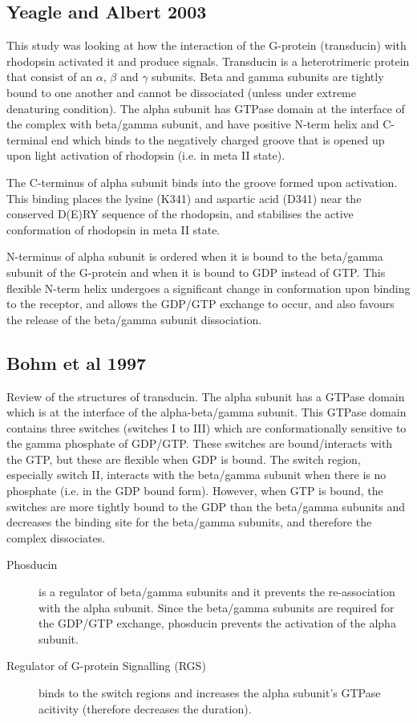 \documentclass[a4paper,12pt]{article}
\begin{document}
\subsection*{\normalsize{Yeagle and Albert 2003}}

This study was looking at how the interaction of the G-protein (transducin) with rhodopsin activated it and produce signals.
Transducin is a heterotrimeric protein that consist of an $\alpha$, $\beta$ and $\gamma$ subunits.
Beta and gamma subunits are tightly bound to one another and cannot be dissociated (unless under extreme denaturing condition).
The alpha subunit has GTPase domain at the interface of the complex with beta/gamma subunit, and have positive N-term helix and C-terminal end which binds to the negatively charged groove that is opened up upon light activation of rhodopsin (i.e. in meta II state).

The C-terminus of alpha subunit binds into the groove formed upon activation.
This binding places the lysine (K341) and aspartic acid (D341) near the conserved D(E)RY sequence of the rhodopsin, and stabilises the active conformation of rhodopsin in meta II state.

N-terminus of alpha subunit is ordered when it is bound to the beta/gamma subunit of the G-protein and when it is bound to GDP instead of GTP.
This flexible N-term helix undergoes a significant change in conformation upon binding to the receptor, and allows the GDP/GTP exchange to occur, and also favours the release of the beta/gamma subunit dissociation.

\subsection*{Bohm et al 1997}

Review of the structures of transducin.
The alpha subunit has a GTPase domain which is at the interface of the alpha-beta/gamma subunit.
This GTPase domain contains three switches (switches I to III) which are conformationally sensitive to the gamma phosphate of GDP/GTP.
These switches are bound/interacts with the GTP, but these are flexible when GDP is bound.
The switch region, especially switch II, interacts with the beta/gamma subunit when there is no phosphate (i.e. in the GDP bound form).
However, when GTP is bound, the switches are more tightly bound to the GDP than the beta/gamma subunits and decreases the binding site for the beta/gamma subunits, and therefore the complex dissociates.

\begin{description}
\item[Phosducin] is a regulator of beta/gamma subunits and it prevents the re-association with the alpha subunit.
Since the beta/gamma subunits are required for the GDP/GTP exchange, phosducin prevents the activation of the alpha subunit.
\item[Regulator of G-protein Signalling (RGS)] binds to the switch regions and increases the alpha subunit's GTPase acitivity (therefore decreases the duration).
\end{description}
\end{document}
